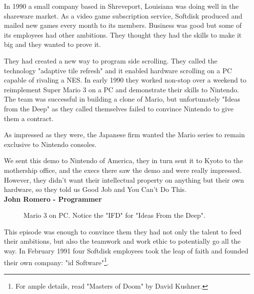 \documentclass[book.tex]{subfiles}
\begin{document}
\label{chapter_team}
In 1990 a small company based in Shreveport, Louisiana was doing well in the shareware market. As a video game subscription service, Softdisk produced and mailed new games every month to its members. Business was good but some of its employees had other ambitions. They thought they had the skills to make it big and they wanted to prove it.\\
\par
They had created a new way to program side scrolling. They called the technology "adaptive tile refresh" and it enabled hardware scrolling on a PC capable of rivaling a NES. In early 1990 they worked non-stop over a weekend to reimplement Super Mario 3 on a PC and demonstrate their skills to Nintendo. The team was successful in building a clone of Mario, but unfortunately "Ideas from the Deep" as they called themselves failed to convince Nintendo to give them a contract.\\
\par As impressed as they were, the Japanese firm wanted the Mario series to remain exclusive to Nintendo consoles.\\
\par
\begin{fancyquotes}
We sent this demo to Nintendo of America, they in turn sent it to Kyoto to the mothership office, and the execs there saw the demo and were really impressed. However, they didn't want their intellectual property on anything but their own hardware, so they told us Good Job and You Can't Do This\protect\footnotemark.
 \bigskip \\
\textbf{John Romero - Programmer}
 \end{fancyquotes}
 \begin{figure}[H]
\caption{Mario 3 on PC. Notice the "IFD" for "Ideas From the Deep".}
\end{figure}

\par
This episode was enough to convince them they had not only the talent to feed their ambitions, but also the teamwork and work ethic to potentially go all the way. In February 1991 four Softdisk employees took the leap of faith and founded their own company: "id Software"\footnote{For ample details, read "Masters of Doom" by David Kushner.}.\\ 
\par
 
\end{document}
